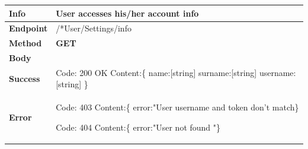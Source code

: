 


\begin{table}[H]
\begin{tabular}{|l|p{}|}
\hline
\textbf{Info}             & User accesses his/her account info                                                                      \\ \hline
\textbf{Endpoint}    &  /*User/Settings/info\\ \hline
\textbf{Method}         &   \textbf{GET}                                                                            \\ \hline

\textbf{Body}  &
                    \\ \hline
                    
\textbf{Success} &  Code: 200 OK \newline
                    Content:\{\newline 
                    name:[string]\newline
                 surname:[string]\newline
                 username:[string]\newline
                    \}\\ \hline
\textbf{Error} &  
                  Code: 403 \newline
                  Content:\{\newline
                  error:"User username and token don't match\newline\}\newline
                  
                  Code: 404 \newline
                  Content:\{\newline
                  error:"User not found "\newline\}\\\hline

\end{tabular}
\end{table}







